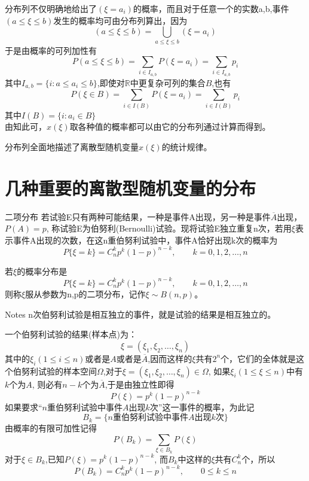 \begin{frame}
分布列不仅明确地给出了$(\xi=a_i)$的概率，而且对于任意一个的实数a,b,事件$(a\le\xi\le b)$发生的概率均可由分布列算出，因为
\[(a\le\xi\le b)=\bigcup_{a\le\xi\le b}(\xi=a_i)\]
于是由概率的可列加性有
\[P(a\le\xi\le b)=\sum_{i\in I_{a,b}}P(\xi=a_i)=\sum_{i\in I_{a,b}}p_i\]
其中$I_{a,b}=\{i:a\le a_i\le b\}$,即使对$\mathbb{R}$中更复杂可列的集合$B$,也有
\[P(\xi\in B)=\sum_{i\in I(B)}P(\xi=a_i)=\sum_{i\in I(B)}p_i\]
其中$I(B)=\{i:a_i\in B\}$\\
由知此可，$x(\xi)$取各种值的概率都可以由它的分布列通过计算而得到。
\begin{block}{}
	分布列全面地描述了离散型随机变量$x(\xi)$的统计规律。
\end{block}
\end{frame}

\section{几种重要的离散型随机变量的分布}

\begin{frame}
\begin{block}{二项分布}
	若试验E只有两种可能结果，一种是事件A出现，另一种是事件$\overline{A}$出现，$P(A)=p$, 称试验E为伯努利(Bernoulli)试验。现将试验E独立重复n次，若用$\xi$表示事件A出现的次数，在这n重伯努利试验中，事件A恰好出现k次的概率为
	\[P\{\xi=k\}=C_{n}^{k}p^{k}(1-p)^{n-k},\qquad k=0,1,2,\dots,n\]
\end{block}
\begin{definition}[二项分布]
	若$\xi$的概率分布是
	\[P\{\xi=k\}=C_{n}^{k}p^{k}(1-p)^{n-k},\qquad k=0,1,2,\dots,n\]
	则称$\xi$服从参数为n,p的二项分布，记作$\xi\sim B(n,p)$。
\end{definition}
\begin{block}{Notes}
	n次伯努利试验是相互独立的事件，就是试验的结果是相互独立的。
\end{block}
\end{frame}

\begin{frame}
一个伯努利试验的结果(样本点)为：
\[\xi=(\xi_1,\xi_2,\dots,\xi_n)\]
其中的$\xi_i(1\le i\le n)$或者是$A$或者是$\overline{A}$,因而这样的$\xi$共有$2^n$个，它们的全体就是这个伯努利试验的样本空间$\Omega$,对于$\xi=(\xi_1,\xi_2,\dots,\xi_n)\in\Omega$, 如果$\xi_i(1\le \xi\le n)$中有$k$个为$A$, 则必有$n-k$个为$\overline{A}$,于是由独立性即得
\[P(\xi)=p^k(1-p)^{n-k}\]
如果要求``$n$重伯努利试验中事件$A$出现$k$次''这一事件的概率，为此记
\[B_k=\{\text{$n$重伯努利试验中事件$A$出现$k$次}\}\]
由概率的有限可加性记得
\[P(B_k)=\sum_{\xi\in B_k}P(\xi)\]
对于$\xi\in B_k$,已知$P(\xi)=p^k(1-p)^{n-k}$, 而$B_k$中这样的$\xi$共有$C_{n}^{k}$个，所以
\[P(B_k)=C_n^k p^k(1-p)^{n-k},\qquad 0\le k\le n\]
\end{frame}

